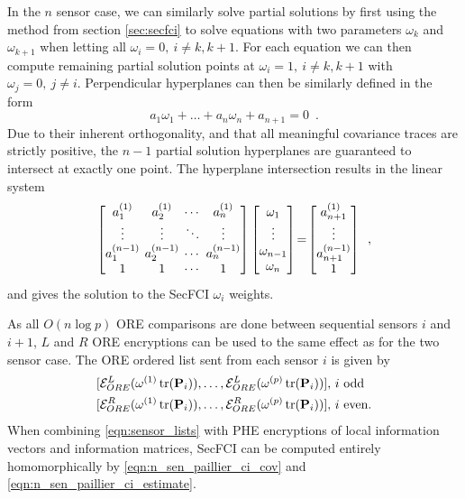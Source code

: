 \documentclass[letterpaper, 10 pt, conference]{ieeeconf}  %
\begin{document}
In the $n$ sensor case, we can similarly solve partial solutions by first using the method from section \ref{sec:secfci} to solve equations with two parameters $\omega_k$ and $\omega_{k+1}$ when letting all $\omega_i=0,\ i\neq k,k+1$. For each equation we can then compute remaining partial solution points at $\omega_i=1,\ i\neq k,k+1$ with $\omega_j=0,\ j\neq i$. Perpendicular hyperplanes can then be similarly defined in the form 
\begin{equation}
   a_1\omega_1 + \dots +a_n\omega_n + a_{n+1} = 0\enspace. \label{eqn:nsen_plane_eq}
\end{equation}
Due to their inherent orthogonality, and that all meaningful covariance traces are strictly positive, the $n-1$ partial solution hyperplanes are guaranteed to intersect at exactly one point. The hyperplane intersection results in the linear system 
\begin{equation}
   \begingroup
   \setlength\arraycolsep{2pt}
   \begin{bmatrix}
      a_1^{(1)} & a_2^{(1)} & \cdots & a_{n}^{(1)} \\
      \vdots & \vdots & \ddots & \vdots \\
      a_1^{(n-1)} & a_2^{(n-1)} & \cdots & a_{n}^{(n-1)} \\
      1 & 1 & \cdots & 1
   \end{bmatrix}
   \begin{bmatrix}
      \omega_1 \\
      \vdots \\
      \omega_{n-1} \\
      \omega_{n}
   \end{bmatrix}
   \!=\!
   \begin{bmatrix}
      a_{n+1}^{(1)} \\
      \vdots \\
      a_{n+1}^{(n-1)} \\
      1
   \end{bmatrix}\enspace, \label{eqn:hyperplane_sol_eq}
   \endgroup
\end{equation}
and gives the solution to the SecFCI $\omega_i$ weights.

As all $O(n\log{p})$ ORE comparisons are done between sequential sensors $i$ and $i+1$, $L$ and $R$ ORE encryptions can be used to the same effect as for the two sensor case. The ORE ordered list sent from each sensor $i$ is given by
\begin{equation}
   \begin{aligned} \label{eqn:sensor_lists}
      &[\mathcal{E}^L_{ORE}(\omega^{(1)}\operatorname{tr}({{\mathbf{P}}}_i)),\dots,\mathcal{E}^L_{ORE}(\omega^{(p)}\operatorname{tr}({{\mathbf{P}}}_i))],\,i\text{ odd} \\
      &[\mathcal{E}^R_{ORE}(\omega^{(1)}\operatorname{tr}({{\mathbf{P}}}_i)),\dots,\mathcal{E}^R_{ORE}(\omega^{(p)}\operatorname{tr}({{\mathbf{P}}}_i))],\,i\text{ even}.
   \end{aligned}
\end{equation}
When combining \eqref{eqn:sensor_lists} with PHE encryptions of local information vectors and information matrices, SecFCI can be computed entirely homomorphically by \eqref{eqn:n_sen_paillier_ci_cov} and \eqref{eqn:n_sen_paillier_ci_estimate}.
\end{document}
